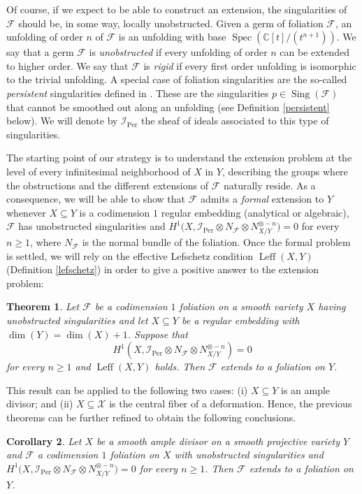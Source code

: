 \documentclass[reqno]{amsart}
\theoremstyle{plain}
\newcommand\C{\mathbb{C}}
\newcommand{\I}{\mathcal{I}}
\renewcommand{\I}{\mathcal{I}}
\newcommand{\X}{\mathcal{X}}
\newcommand{\F}{\mathscr{F}}
\DeclareMathOperator{\Spec}{Spec}
\DeclareMathOperator{\Sing}{Sing}
\DeclareMathOperator{\Per}{Per}
\DeclareMathOperator{\Leff}{Leff}
\newcounter{Theorem}
\newtheorem{theorem}{Theorem}[section]
\newtheorem{corollary}[theorem]{Corollary}
\theoremstyle{definition}
\theoremstyle{named}
\begin{document}
 Of course, if we expect to be able to construct an extension, the singularities of $\F$ should be, in some way, locally unobstructed. Given a germ of foliation $\F$, an unfolding of order $n$ of $\F$ is an unfolding with base $\Spec(\C[t]/(t^{n+1}))$. We say that a germ $\F$ is  \emph{unobstructed} if every unfolding of order $n$ can be extended to higher order. We say that $\F$ is \emph{rigid} if every first order unfolding is isomorphic to the trivial unfolding. 
A special case of foliation singularities are the so-called \emph{persistent} singularities defined in \cite{persistent2021}. These are the singularities $p\in \Sing(\F)$ that cannot be smoothed out 
along an unfolding (see Definition \ref{persistent} below). We will denote by $\I_{\Per}$ the sheaf of ideals associated to this type of singularities.

The starting point of our strategy is to understand the extension problem at the level of every infinitesimal neighborhood of $X$ in $Y$, describing the groups where the obstructions and the different extensions of $\F$ naturally reside. As a consequence, 
we will be able to show that $\F$ admits a \emph{formal} extension to $Y$ whenever $X\subseteq Y$ is a codimension $1$ regular embedding (analytical or algebraic), $\F$ has unobstructed singularities and 
$H^1\big(X,\I_{\Per}\otimes N_\F\otimes N_{X/Y}^{\otimes -n}\big)=0$
for every $n\geqslant 1$, where $N_\F$ is the normal bundle of the foliation. Once the formal problem is settled, we will rely on the effective Lefschetz condition $\Leff(X,Y)$ (Definition \ref{lefschetz}) in order to give a positive answer to the extension problem:

\begin{theorem}
   Let $\F$ be a codimension $1$ foliation on a smooth variety $X$ having unobstructed singularities and let $X\subseteq Y$ be a regular embedding with $\dim(Y)=\dim(X)+1$.  
   Suppose that $$H^1(X,\I_{\Per}\otimes N_\F\otimes N_{X/Y}^{\otimes -n})=0$$
   for every $n\geqslant 1$ and $\Leff(X,Y)$ holds.
    Then $\F$ extends to a foliation on $Y$. 
\end{theorem}

This result can be applied to the following two cases: (i) $X\subseteq Y$ is an ample divisor; and (ii) $X\subseteq \X$ is the central fiber of a deformation. Hence, the previous theorems can be further refined to obtain the following conclusions.

\begin{corollary}
     Let $X$ be a smooth ample divisor on a smooth projective variety $Y$ and $\F$ a codimension $1$ foliation on $X$ with unobstructed singularities and $H^1\big(X,\I_{\Per}\otimes N_\F\otimes N_{X/Y}^{\otimes - n}\big)=0$ for every $n\geqslant 1$. Then $\F$ extends to a foliation on $Y$.
\end{corollary}
\end{document}
